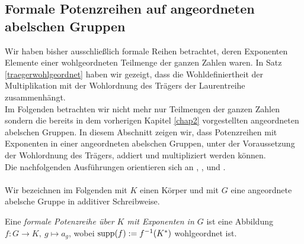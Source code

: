 \subsection{Formale Potenzreihen auf angeordneten abelschen Gruppen}
%
% 
%
%
%
%
Wir haben bisher ausschließlich formale Reihen betrachtet, deren Exponenten Elemente einer wohlgeordneten Teilmenge der ganzen Zahlen waren. In Satz \ref{traegerwohlgeordnet} haben wir gezeigt, dass die Wohldefiniertheit der Multiplikation mit der Wohlordnung des Trägers der Laurentreihe zusammenhängt. \\
Im Folgenden betrachten wir nicht mehr nur Teilmengen der ganzen Zahlen sondern die bereits in dem vorherigen Kapitel \ref{chap2} vorgestellten angeordneten abelschen Gruppen. In diesem Abschnitt zeigen wir, dass Potenzreihen mit Exponenten in einer angeordneten abelschen Gruppen, unter der Voraussetzung der Wohlordnung des Trägers, addiert und multipliziert werden können.\\  
  Die nachfolgenden Ausführungen orientieren sich an \cite[S. 194 - 199]{fuchs66}, \cite[S. 601 - 655]{hahn07}, \cite[S. 6 - 20]{ucsnay63} und \cite[S. 49 - 64]{priesscrampe83}.\\\\
Wir bezeichnen im Folgenden mit $K$ einen Körper und mit $G$ eine angeordnete abelsche Gruppe in additiver Schreibweise.
%
%
%
%
%
%
\begin{defn}\label{funktionsDefinitionFormalePotenzreihe}
Eine \textit{formale Potenzreihe über $K$ mit Exponenten in $G$} ist eine Abbildung $f\colon G \to K, ~g \mapsto a_g$, wobei $\textup{supp}(f) := f^{-1} (K^*)$ wohlgeordnet ist.
\end{defn}
%
%
%



